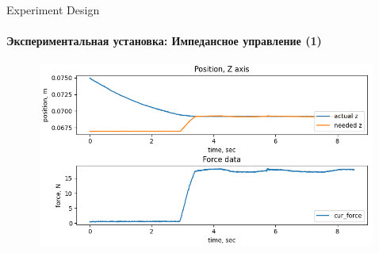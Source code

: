 \documentclass[aspectratio=169,xcolor=table]{beamer}
\begin{document}
\begin{frame}[t]{Experiment Design}
    \framesubtitle{Экспериментальная установка: Импедансное управление (1)}
    \vspace{-15pt}
    \begin{figure}[H]
        \centering\includegraphics[height=6.1cm,width=1\textwidth,keepaspectratio]{force_data_pos.png}
        \label{fig:impedance}
    \end{figure}
\end{frame}
\end{document}
